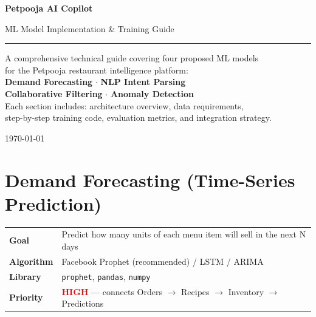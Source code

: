 \documentclass[12pt, a4paper]{article}
\begin{document}
\begin{titlepage}
    \centering
    \vspace*{3cm}
    
    {\Huge\bfseries\color{darkslate} Petpooja AI Copilot \par}
    \vspace{0.5cm}
    {\LARGE\color{gray} ML Model Implementation \& Training Guide \par}
    \vspace{1cm}
    {\color{orange}\rule{6cm}{2pt}\par}
    \vspace{1.5cm}
    
    {\large\color{gray}
    A comprehensive technical guide covering four proposed ML models\\[6pt]
    for the Petpooja restaurant intelligence platform:\\[12pt]
    \textbf{Demand Forecasting} $\cdot$ \textbf{NLP Intent Parsing}\\[4pt]
    \textbf{Collaborative Filtering} $\cdot$ \textbf{Anomaly Detection}\\[24pt]
    Each section includes: architecture overview, data requirements,\\
    step-by-step training code, evaluation metrics, and integration strategy.
    \par}
    
    \vfill
    {\color{gray}\today}
\end{titlepage}

\tableofcontents
\newpage


\section{Demand Forecasting (Time-Series Prediction)}

\begin{infobox}
\begin{tabularx}{\textwidth}{@{}lX@{}}
\textbf{Goal}       & Predict how many units of each menu item will sell in the next N days \\
\textbf{Algorithm}  & Facebook Prophet (recommended) / LSTM / ARIMA \\
\textbf{Library}    & \texttt{prophet}, \texttt{pandas}, \texttt{numpy} \\
\textbf{Priority}   & \textcolor{red}{\textbf{HIGH}} --- connects Orders $\to$ Recipes $\to$ Inventory $\to$ Predictions \\
\end{tabularx}
\end{infobox}
\end{document}
